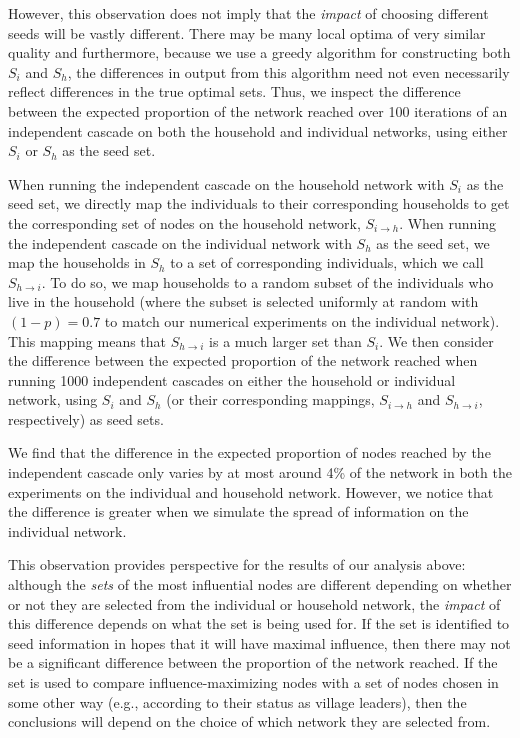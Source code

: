 However, this observation does not imply that the \textit{impact} of choosing different seeds will be vastly different. There may be many local optima of very similar quality and furthermore, because we use a greedy algorithm for constructing both $S_i$ and $S_h$, the differences in output from this algorithm need not even necessarily reflect differences in the true optimal sets. Thus, we inspect the difference between the expected proportion of the network reached over 100 iterations of an independent cascade on both the household and individual networks, using either $S_i$ or $S_h$ as the seed set. 

When running the independent cascade on the household network with $S_i$ as the seed set, we directly map the individuals to their corresponding households to get the corresponding set of nodes on the household network, $S_{i\rightarrow h}$. When running the independent cascade on the individual network with $S_h$ as the seed set, we map the households in $S_h$ to a set of corresponding individuals, which we call $S_{h\rightarrow i}$. To do so, we map households to a random subset of the individuals who live in the household (where the subset is selected uniformly at random with $(1-p)=0.7$ to match our numerical experiments on the individual network). This mapping means that $S_{h\rightarrow i}$ is a much larger set than $S_i$. We then consider the difference between the expected proportion of the network reached when running 1000 independent cascades on either the household or individual network, using $S_i$ and $S_h$ (or their corresponding mappings, $S_{i\rightarrow h}$ and $S_{h \rightarrow i}$, respectively) as seed sets.

We find that the difference in the expected proportion of nodes reached by the independent cascade only varies by at most around 4\% of the network in both the experiments on the individual and household network. However, we notice that the difference is greater when we simulate the spread of information on the individual network. 

This observation provides perspective for the results of our analysis above: although the \textit{sets} of the most influential nodes are different depending on whether or not they are selected from the individual or household network, the \textit{impact} of this difference depends on what the set is being used for. If the set is identified to seed information in hopes that it will have maximal influence, then there may not be a significant difference between the proportion of the network reached. If the set is used to compare influence-maximizing nodes with a set of nodes chosen in some other way (e.g., according to their status as village leaders), then the conclusions will depend on the choice of which network they are selected from.


